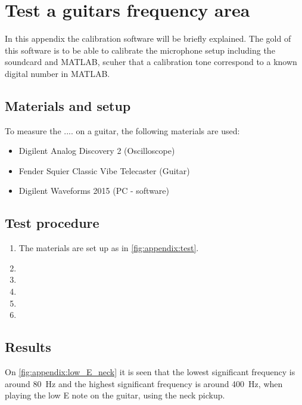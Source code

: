 \chapter*{Test a guitars frequency area}
In this appendix the calibration software will be briefly explained. The gold of this software is to be able to calibrate the microphone setup including the soundcard and MATLAB, scuher that a calibration tone correspond to a known digital number in MATLAB. 

\section*{Materials and setup}
To measure the .... on a guitar, the following materials are used:
\begin{itemize}
\item Digilent Analog Discovery 2 (Oscilloscope)
\item Fender Squier Classic Vibe Telecaster (Guitar)
\item Digilent Waveforms 2015 (PC - software)
\end{itemize}

%

\section*{Test procedure}


\begin{enumerate}
\item The materials are set up as in \autoref{fig:appendix:test}.
\item 
\item  
\item  
\item 
\item 
\end{enumerate}

\section*{Results}


On  \autoref{fig:appendix:low_E_neck} it is seen that the lowest significant frequency is around \SI{80}{\hertz} and the highest significant frequency is around \SI{400}{\hertz}, when playing the low E note on the guitar, using the neck pickup.

